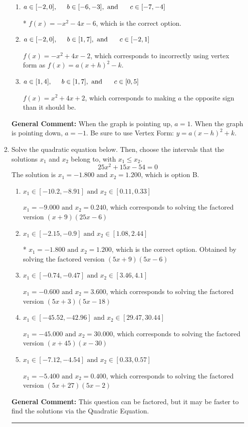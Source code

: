 \documentclass{extbook}[14pt]
\newcommand{\litem}[1]{\item #1

\rule{\textwidth}{0.4pt}}
\begin{document}
\begin{enumerate}
{\begin{enumerate}[label=\Alph*.]
$f(x)=x^{2} -4 x + 2$, which corresponds to incorrectly using vertex form as $f(x) = a(x+h)^2+k$ AND making $a$ the opposite sign than it should be.
\item \( a \in [-2, 0], \hspace*{5mm} b \in [-6, -3], \text{ and } \hspace*{5mm} c \in [-7, -4] \)

* $f(x)=-x^{2} -4 x -6$, which is the correct option.
\item \( a \in [-2, 0], \hspace*{5mm} b \in [1, 7], \text{ and } \hspace*{5mm} c \in [-2, 1] \)

$f(x)=-x^{2} +4 x -2$, which corresponds to incorrectly using vertex form as $f(x) = a(x+h)^2 - k$.
\item \( a \in [1, 4], \hspace*{5mm} b \in [1, 7], \text{ and } \hspace*{5mm} c \in [0, 5] \)

$f(x)=x^{2} +4 x + 2$, which corresponds to making $a$ the opposite sign than it should be.
\end{enumerate}

\textbf{General Comment:} When the graph is pointing up, $a=1$. When the graph is pointing down, $a=-1$. Be sure to use Vertex Form: $y = a(x-h)^2+k$.
}
\litem{
Solve the quadratic equation below. Then, choose the intervals that the solutions $x_1$ and $x_2$ belong to, with $x_1 \leq x_2$.
\[ 25x^{2} +15 x -54 = 0 \]The solution is \( x_1 = -1.800 \text{ and } x_2 = 1.200 \), which is option B.\begin{enumerate}[label=\Alph*.]
\item \( x_1 \in [-10.2, -8.91] \text{ and } x_2 \in [0.11, 0.33] \)

$x_1 = -9.000 \text{ and } x_2 = 0.240$, which corresponds to solving the factored version $(x + 9)(25x -6)$
\item \( x_1 \in [-2.15, -0.9] \text{ and } x_2 \in [1.08, 2.44] \)

* $x_1 = -1.800 \text{ and } x_2 = 1.200$, which is the correct option. Obtained by solving the factored version $(5x + 9)(5x -6)$
\item \( x_1 \in [-0.74, -0.47] \text{ and } x_2 \in [3.46, 4.1] \)

$x_1 = -0.600 \text{ and } x_2 = 3.600$, which corresponds to solving the factored version $(5x + 3)(5x -18)$
\item \( x_1 \in [-45.52, -42.96] \text{ and } x_2 \in [29.47, 30.44] \)

$x_1 = -45.000 \text{ and } x_2 = 30.000$, which corresponds to solving the factored version $(x + 45)(x -30)$
\item \( x_1 \in [-7.12, -4.54] \text{ and } x_2 \in [0.33, 0.57] \)

$x_1 = -5.400 \text{ and } x_2 = 0.400$, which corresponds to solving the factored version $(5x + 27)(5x -2)$
\end{enumerate}

\textbf{General Comment:} This question can be factored, but it may be faster to find the solutions via the Quadratic Equation.
}
\end{enumerate}
\end{document}
